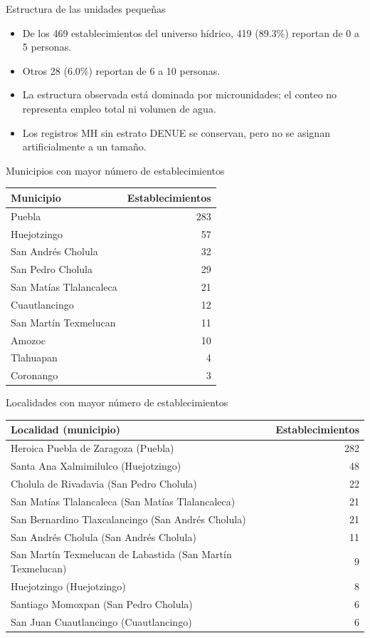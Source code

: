 \documentclass[aspectratio=169]{beamer}
\begin{document}
\begin{frame}{Estructura de las unidades pequeñas}
\begin{itemize}
\item De los 469 establecimientos del universo hídrico,
419 (89.3\%) reportan de 0 a 5 personas.
\item Otros 28 (6.0\%) reportan de 6 a 10 personas.
\item La estructura observada está dominada por microunidades; el conteo no representa empleo total ni volumen de agua.
\item Los registros MH sin estrato DENUE se conservan, pero no se asignan artificialmente a un tamaño.
\end{itemize}
\end{frame}
\begin{frame}{Municipios con mayor número de establecimientos}
\centering\small
\begin{tabular}{lr}\toprule Municipio & Establecimientos\\\midrule
Puebla & 283\\
Huejotzingo & 57\\
San Andrés Cholula & 32\\
San Pedro Cholula & 29\\
San Matías Tlalancaleca & 21\\
Cuautlancingo & 12\\
San Martín Texmelucan & 11\\
Amozoc & 10\\
Tlahuapan & 4\\
Coronango & 3\\
\bottomrule\end{tabular}
\end{frame}
\begin{frame}{Localidades con mayor número de establecimientos}
\centering\scriptsize
\begin{tabular}{lr}\toprule Localidad (municipio) & Establecimientos\\\midrule
Heroica Puebla de Zaragoza (Puebla) & 282\\
Santa Ana Xalmimilulco (Huejotzingo) & 48\\
Cholula de Rivadavia (San Pedro Cholula) & 22\\
San Matías Tlalancaleca (San Matías Tlalancaleca) & 21\\
San Bernardino Tlaxcalancingo (San Andrés Cholula) & 21\\
San Andrés Cholula (San Andrés Cholula) & 11\\
San Martín Texmelucan de Labastida (San Martín Texmelucan) & 9\\
Huejotzingo (Huejotzingo) & 8\\
Santiago Momoxpan (San Pedro Cholula) & 6\\
San Juan Cuautlancingo (Cuautlancingo) & 6\\
\bottomrule\end{tabular}
\end{frame}
\end{document}
